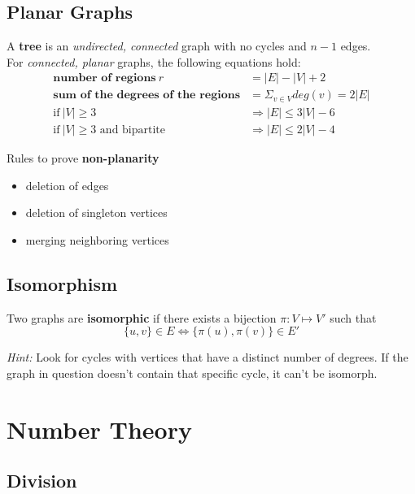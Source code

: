 \documentclass[11pt]{article}
\begin{document}
\subsection{Planar Graphs}

A \textbf{tree} is an \emph{undirected, connected} graph with no cycles and $n-1$ edges. \\

For \emph{connected, planar} graphs, the following equations hold:
\begin{equation*}
\begin{split}
	\textbf{number of regions} \ r &  = |E| - |V| + 2 \\
	\textbf{sum of the degrees of the regions} & = \Sigma_{v \in V}deg(v) = 2|E| \\
	\text{if} \ |V| \geq 3 & \Rightarrow |E| \leq 3|V| - 6 \\
	\text{if} \ |V| \geq 3 \text{ and bipartite} & \Rightarrow |E| \leq 2|V| - 4
\end{split}
\end{equation*}

Rules to prove \textbf{non-planarity}
\begin{itemize}[noitemsep]
	\item deletion of edges
	\item deletion of singleton vertices
	\item merging neighboring vertices
\end{itemize}

\subsection{Isomorphism}

Two graphs are \textbf{isomorphic} if there exists a bijection $\pi: V \mapsto V'$ such that 
\begin{equation*}
	\{u,v\} \in E \Leftrightarrow \{\pi(u), \pi(v)\} \in E'
\end{equation*}

\emph{Hint:} Look for cycles with vertices that have a distinct number of degrees. If the graph in question doesn't contain that specific cycle, it can't be isomorph.

\section{Number Theory}

\subsection{Division}
\end{document}

